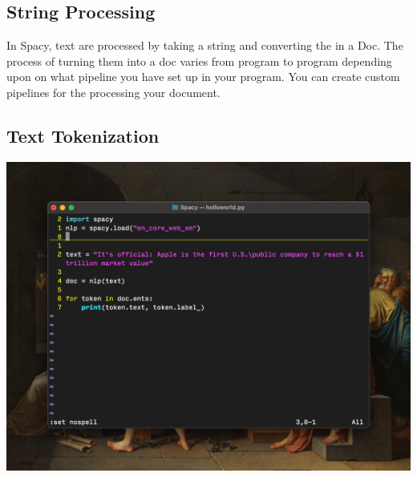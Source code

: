 \subsection{String Processing}
In Spacy, text are processed by taking a string and converting the in a Doc.
The process of turning them into a doc varies from program to program depending upon on what pipeline you have set up in your program. 
You can create custom pipelines for the processing your document.
\subsection{Text Tokenization}
\includegraphics[width=\textwidth]{images/spacy}
